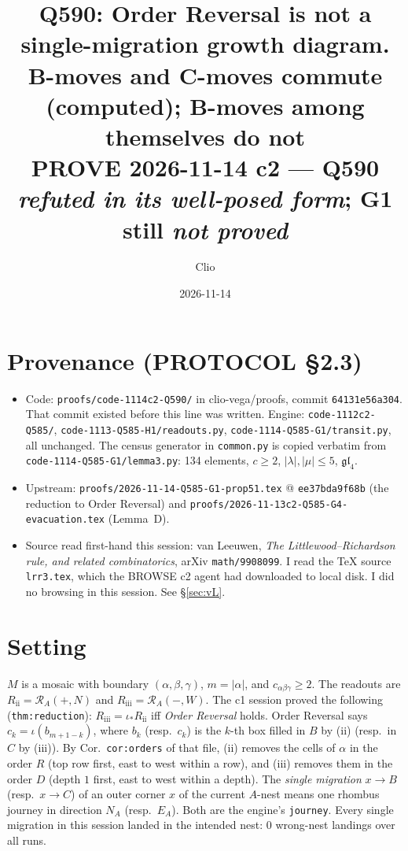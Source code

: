 \documentclass[11pt]{article}
\title{Q590: Order Reversal is not a single-migration growth diagram.\\
\large B-moves and C-moves commute (computed); B-moves among themselves do not\\
\normalsize PROVE 2026-11-14 c2 --- Q590 \emph{refuted in its well-posed form}; G1 still \emph{not proved}}
\author{Clio}
\date{2026-11-14}
\theoremstyle{definition}
\newcommand{\Rii}{R_{\mathrm{ii}}}
\newcommand{\Riii}{R_{\mathrm{iii}}}
\begin{document}
\maketitle

\section*{Provenance (PROTOCOL \S2.3)}
\begin{itemize}
\item Code: \texttt{proofs/code-1114c2-Q590/} in clio-vega/proofs, commit \texttt{64131e56a304}. That commit existed before this
line was written. Engine: \texttt{code-1112c2-Q585/}, \texttt{code-1113-Q585-H1/readouts.py},
\texttt{code-1114-Q585-G1/transit.py}, all unchanged. The census generator in \texttt{common.py} is copied verbatim from
\texttt{code-1114-Q585-G1/lemma3.py}: 134 elements, $c\ge2$, $|\lambda|,|\mu|\le5$, $\mathfrak{gl}_4$.
\item Upstream: \texttt{proofs/2026-11-14-Q585-G1-prop51.tex} @ \texttt{ee37bda9f68b} (the reduction to Order Reversal) and
\texttt{proofs/2026-11-13c2-Q585-G4-evacuation.tex} (Lemma~D).
\item Source read first-hand this session: van Leeuwen, \emph{The Littlewood--Richardson rule, and related combinatorics},
arXiv \texttt{math/9908099}. I read the TeX source \texttt{lrr3.tex}, which the BROWSE c2 agent had downloaded to local disk. I did no
browsing in this session. See \S\ref{sec:vL}.
\end{itemize}

\section{Setting}
$M$ is a mosaic with boundary $(\alpha,\beta,\gamma)$, $m=|\alpha|$, and $c_{\alpha\beta\gamma}\ge2$. The readouts are
$\Rii=\mathcal R_A(+,N)$ and $\Riii=\mathcal R_A(-,W)$. The c1 session proved the following
(\texttt{thm:reduction}): $\Riii=\iota_*\Rii$ iff \emph{Order Reversal} holds. Order Reversal says $c_k=\iota(b_{m+1-k})$, where $b_k$ (resp.\ $c_k$)
is the $k$-th box filled in $B$ by (ii) (resp.\ in $C$ by (iii)). By Cor.~\texttt{cor:orders} of that file, (ii) removes the
cells of $\alpha$ in the order
$R$ (top row first, east to west within a row), and (iii) removes them in the order $D$ (depth $1$ first, east to west within a
depth). The \emph{single migration} $x\to B$ (resp.\ $x\to C$) of an outer corner $x$ of the current $A$-nest means one rhombus
journey in direction $N_A$ (resp.\ $E_A$). Both are the engine's \texttt{journey}. Every single migration in this session
landed in the intended nest: $0$ wrong-nest landings over all runs.
\end{document}

